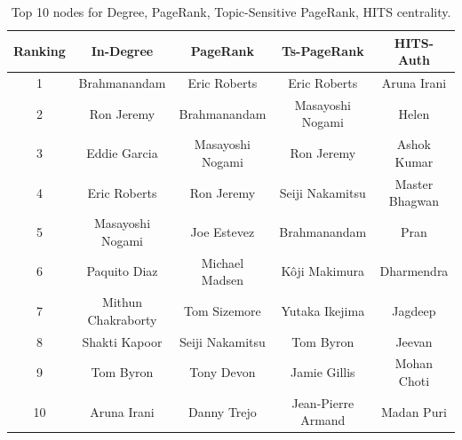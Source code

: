 \documentclass{article}
\begin{document}
\begin{table}[]
    \centering
    \begin{adjustbox}{max width=\textwidth}
    \begin{tabular}{c|c|c|c|c}
    Ranking &   In-Degree &     PageRank &      Ts-PageRank &       HITS-Auth  \\
    \hline
    1 &     Brahmanandam &      Eric Roberts &  Eric Roberts &      Aruna Irani \\
    2 &     Ron Jeremy &        Brahmanandam &      Masayoshi Nogami &      	Helen \\
    3 &     Eddie Garcia &      Masayoshi Nogami &      Ron Jeremy &        Ashok Kumar \\
    4 &     Eric Roberts &      Ron Jeremy &        Seiji Nakamitsu &       Master Bhagwan \\
    5 &     Masayoshi Nogami &      Joe Estevez &       Brahmanandam &      Pran \\
    6 &     Paquito Diaz &      Michael Madsen &        Kôji Makimura &         Dharmendra \\
    7 &     Mithun Chakraborty &        Tom Sizemore &      Yutaka Ikejima &        Jagdeep \\
    8 &     Shakti Kapoor &     Seiji Nakamitsu &       Tom Byron &     Jeevan \\
    9 &     Tom Byron &     Tony Devon &        Jamie Gillis &      Mohan Choti \\
    10 &    Aruna Irani &       Danny Trejo &       Jean-Pierre Armand &        Madan Puri \\	
    \end{tabular}
    \end{adjustbox}
    \caption{Top 10 nodes for Degree, PageRank, Topic-Sensitive PageRank, HITS centrality.}
    \label{tab:rankings}
\end{table}
\end{document}
